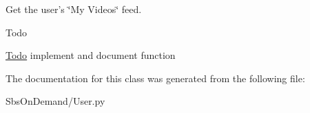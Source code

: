 \-Get the user's \char`\"{}\-My Videos\char`\"{} feed. 

\begin{DoxyRefDesc}{\-Todo}
\item[\hyperlink{todo__todo000007}{\-Todo}]implement and document function \end{DoxyRefDesc}


\-The documentation for this class was generated from the following file\-:\begin{DoxyCompactItemize}
\item 
\-Sbs\-On\-Demand/\-User.\-py\end{DoxyCompactItemize}

